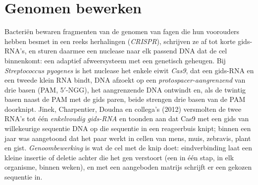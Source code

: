 \section{Genomen bewerken}

\begin{definition}\label{def:b3:genetic-engineering:crispr}
Bacteriën bewaren fragmenten van de genomen van fagen die hun
voorouders hebben besmet in een reeks herhalingen (\emph{CRISPR}),
schrijven ze af tot korte gids-RNA's, en sturen daarmee een nuclease
naar elk passend DNA dat de cel binnenkomt: een adaptief afweersysteem
met een genetisch geheugen. Bij \emph{Streptococcus pyogenes} is het
nuclease het enkele eiwit \emph{Cas9}, dat een gids-RNA en een tweede
klein RNA bindt, DNA afzoekt op een \emph{protospacer-aangrenzend
} van drie basen (PAM, 5$'$-NGG), het aangrenzende DNA ontwindt
en, als de twintig basen naast de PAM met de gids paren, beide strengen
drie basen van de PAM doorknipt. Jinek, Charpentier, Doudna en
collega's (2012) versmolten de twee RNA's tot één \emph{enkelvoudig
gids-RNA} en toonden aan dat Cas9 met een gids van willekeurige
sequentie DNA op die sequentie in een reageerbuis knipt; binnen een
jaar was aangetoond dat het paar werkt in cellen van mens, muis,
zebravis, plant en gist. \emph{Genoombewerking} is wat de cel met de
knip doet: eindverbinding laat een kleine insertie of deletie achter
die het gen verstoort (een  in één stap, in elk organisme,
binnen weken), en  met een aangeboden matrijs
schrijft er een gekozen sequentie in.
\end{definition}

